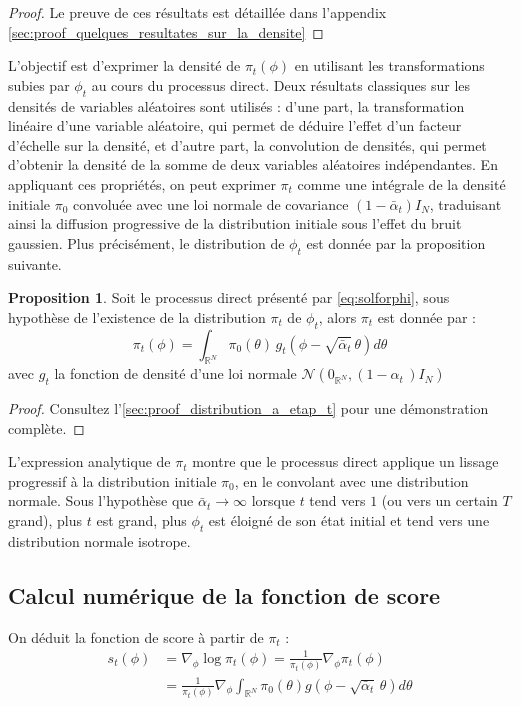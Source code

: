 \documentclass[a4paper,10pt]{article}
\theoremstyle{definition} %
\theoremstyle{definition} %
\newtheorem{proposition}[definition]{Proposition}
\theoremstyle{definition} %
\theoremstyle{definition} %
\newcommand{\R}{\mathbb{R}}
\begin{document}
\begin{proof}
    Le preuve de ces résultats est détaillée dans l'appendix \cref{sec:proof_quelques_resultates_sur_la_densite}
\end{proof}

L’objectif est d’exprimer la densité de \(\pi_t(\phi)\) en utilisant les transformations subies par \(\phi_t\) au cours du processus direct. Deux résultats classiques sur les densités de variables aléatoires sont utilisés : d’une part, la transformation linéaire d’une variable aléatoire, qui permet de déduire l’effet d’un facteur d’échelle sur la densité, et d’autre part, la convolution de densités, qui permet d’obtenir la densité de la somme de deux variables aléatoires indépendantes. En appliquant ces propriétés, on peut exprimer \(\pi_t\) comme une intégrale de la densité initiale \(\pi_0\) convoluée avec une loi normale de covariance \((1 - \bar{\alpha}_t) I_N\), traduisant ainsi la diffusion progressive de la distribution initiale sous l’effet du bruit gaussien. Plus précisément, le distribution de $\phi_t$ est donnée par la proposition suivante.

\begin{proposition}\label{prop:distribution_a_etap_t}
    Soit le processus direct présenté par \cref{eq:solforphi}, sous hypothèse de l'existence de la distribution $\pi_t$ de $\phi_t$, alors $\pi_t$ est donnée par :
    \begin{equation}\label{eq:distribution_pi_t}
        \pi_t(\phi) = \int_{\R^N} \pi_0(\theta)\, g_t(\phi - \sqrt{\bar \alpha_t}\,\theta) d\theta
    \end{equation}
    avec $g_t$ la fonction de densité d'une loi normale $\mathcal{N}\left(0_{\R^N}, (1- \alpha _t \,)I_N\right)$
\end{proposition}

\begin{proof}
    Consultez l'\cref{sec:proof_distribution_a_etap_t} pour une démonstration complète.
\end{proof}

L'expression analytique de $\pi_t$ montre que le processus direct applique un lissage progressif à la distribution initiale $\pi_0$, en le convolant avec une distribution normale. Sous l'hypothèse que $\bar \alpha_t \rightarrow \infty$ lorsque $t$ tend vers $1$ (ou vers un certain $T$ grand), plus $t$ est grand, plus $\phi_t$ est éloigné de son état initial et tend vers une distribution normale isotrope.
\subsection{Calcul numérique de la fonction de score}
On déduit la fonction de score à partir de $\pi_t$ :
\begin{align*}
        s_t(\phi) &= \nabla_\phi \log \pi_t(\phi) = \frac{1}{\pi_t(\phi)}\nabla_\phi\pi_t(\phi) \\
        &= \frac{1}{\pi_t(\phi)}\nabla_\phi\int_{\R^N} \pi_0(\theta) g(\phi - \sqrt{\bar \alpha_t} \,\theta) d\theta\\
\end{align*}
\end{document}
